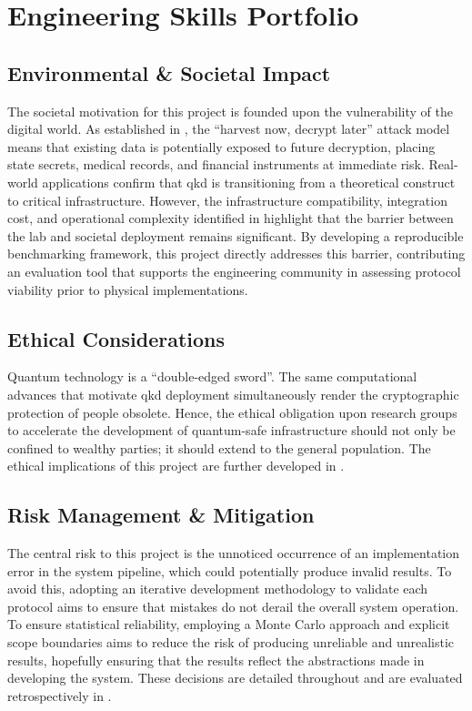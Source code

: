 \documentclass[11pt, a4paper]{report}
\begin{document}
\newpage
\section{Engineering Skills Portfolio}
\label{sec:skillssec}

\subsection{Environmental \& Societal Impact}
\label{subsec:skill_societal}

The societal motivation for this project is founded upon the vulnerability of the digital world. As established in , the ``harvest now, decrypt later'' attack model means that existing data is potentially exposed to future decryption, placing state secrets, medical records, and financial instruments at immediate risk. Real-world applications confirm that \gls{qkd} is transitioning from a theoretical construct to critical infrastructure. However, the infrastructure compatibility, integration cost, and operational complexity identified in  highlight that the barrier between the lab and societal deployment remains significant. By developing a reproducible benchmarking framework, this project directly addresses this barrier, contributing an evaluation tool that supports the engineering community in assessing protocol viability prior to physical implementations.

\subsection{Ethical Considerations}
\label{subsec:skill_ethics}

Quantum technology is a ``double-edged sword''. The same computational advances that motivate \gls{qkd} deployment simultaneously render the cryptographic protection of people obsolete. Hence, the ethical obligation upon research groups to accelerate the development of quantum-safe infrastructure should not only be confined to wealthy parties; it should extend to the general population. The ethical implications of this project are further developed in .

\subsection{Risk Management \& Mitigation}
\label{subsec:skill_risk}

The central risk to this project is the unnoticed occurrence of an implementation error in the system pipeline, which could potentially produce invalid results. To avoid this, adopting an iterative development methodology to validate each protocol aims to ensure that mistakes do not derail the overall system operation. To ensure statistical reliability, employing a Monte Carlo approach and explicit scope boundaries aims to reduce the risk of producing unreliable and unrealistic results, hopefully ensuring that the results reflect the abstractions made in developing the system. These decisions are detailed throughout  and are evaluated retrospectively in .
\end{document}
